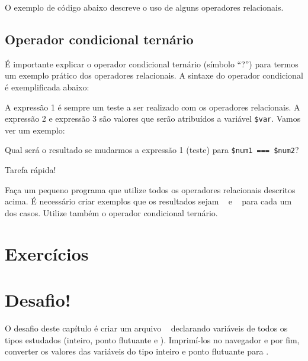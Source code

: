 

O exemplo de código abaixo descreve o uso de alguns operadores relacionais.



\subsection{Operador condicional ternário}
\label{operador-condicional-ternario}

É importante explicar o operador condicional ternário (símbolo ``?'') para termos um exemplo 
prático dos operadores relacionais. A sintaxe do operador condicional é exemplificada abaixo:



A expressão 1 é sempre um teste a ser realizado com os operadores relacionais. A expressão
2 e expressão 3 são valores que serão atribuídos a variável \texttt{\$var}. Vamos ver um exemplo:



Qual será o resultado se mudarmos a expressão 1 (teste) para \texttt{\$num1 === \$num2}?

{\Large Tarefa rápida!}

Faça um pequeno programa que utilize todos os operadores relacionais descritos acima.
É necessário criar exemplos que os resultados sejam \true~ e \false~ para cada
um dos casos. Utilize também o operador condicional ternário.


\section{Exercícios}
\label{cap4-exercicios}


\section{Desafio!}
\label{cap4-desafio}
O desafio deste capítulo é criar um arquivo \phpextensao~ declarando variáveis de todos os tipos
estudados (inteiro, ponto flutuante e \tipostring). Imprimí-los no navegador e por fim, converter
os valores das variáveis do tipo inteiro e ponto flutuante para \tipostring.
